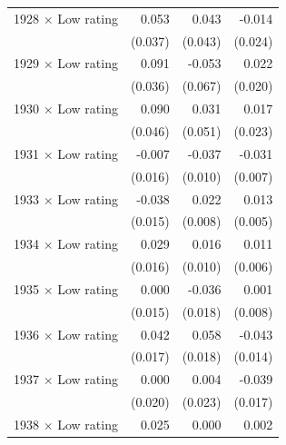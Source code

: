 {\begin{tabular}{l*{3}{D{.}{.}{-1}}}
1928 \ensuremath{\times} Low rating&       0.053         &       0.043         &      -0.014         \\
                    &     (0.037)         &     (0.043)         &     (0.024)         \\
1929 \ensuremath{\times} Low rating&       0.091\sym{**} &      -0.053         &       0.022         \\
                    &     (0.036)         &     (0.067)         &     (0.020)         \\
1930 \ensuremath{\times} Low rating&       0.090\sym{*}  &       0.031         &       0.017         \\
                    &     (0.046)         &     (0.051)         &     (0.023)         \\
1931 \ensuremath{\times} Low rating&      -0.007         &      -0.037\sym{***}&      -0.031\sym{***}\\
                    &     (0.016)         &     (0.010)         &     (0.007)         \\
1933 \ensuremath{\times} Low rating&      -0.038\sym{**} &       0.022\sym{**} &       0.013\sym{**} \\
                    &     (0.015)         &     (0.008)         &     (0.005)         \\
1934 \ensuremath{\times} Low rating&       0.029\sym{*}  &       0.016         &       0.011\sym{*}  \\
                    &     (0.016)         &     (0.010)         &     (0.006)         \\
1935 \ensuremath{\times} Low rating&       0.000         &      -0.036\sym{*}  &       0.001         \\
                    &     (0.015)         &     (0.018)         &     (0.008)         \\
1936 \ensuremath{\times} Low rating&       0.042\sym{**} &       0.058\sym{***}&      -0.043\sym{***}\\
                    &     (0.017)         &     (0.018)         &     (0.014)         \\
1937 \ensuremath{\times} Low rating&       0.000         &       0.004         &      -0.039\sym{**} \\
                    &     (0.020)         &     (0.023)         &     (0.017)         \\
1938 \ensuremath{\times} Low rating&       0.025         &       0.000         &       0.002         \\

\end{tabular}}

